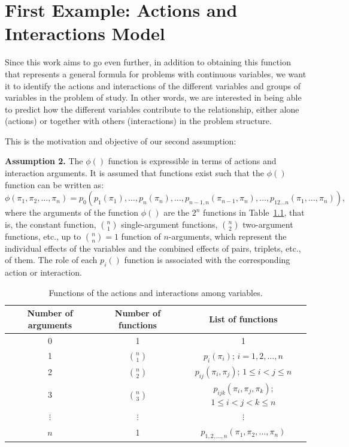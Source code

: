 \documentclass[
	11pt, %
	fleqn, %
	a4paper, %
]{LegrandOrangeBook}
\begin{document}
\chapter{First Example: Actions and Interactions Model}\label{actions-interactionschapter}
\label{ch:firstexampleACtion-Interactions}

Since this work aims to go even further, in addition to obtaining this function that represents a general formula for problems with continuous variables, we want it to identify the actions and interactions of the different variables and groups of variables in the problem of study. In other words, we are interested in being able to predict how the different variables contribute to the relationship, either alone (actions) or together with others (interactions) in the problem structure.

This is the motivation and objective of our second assumption:

\textbf{Assumption 2.} The $\phi()$ function is expressible in terms of actions and interaction arguments. It is assumed that functions exist such that the $\phi()$ function can be written as:
\begin{equation}
\phi(\pi_1,\pi_2,\ldots,\pi_n) = p_0(p_1(\pi_1),\ldots, p_n(\pi_n),\ldots, p_{n-1,n}(\pi_{n-1},\pi_n),\ldots, p_{12\ldots n}(\pi_1,\ldots,\pi_n)),
\label{eq:actionsinteractions}
\end{equation}
where the arguments of the function $\phi()$ are the $2^n$ functions in Table~\ref{tab:functions}, that is, the constant function, $\binom{n}{1}$ single-argument functions, $\binom{n}{2}$ two-argument functions, etc., up to $\binom{n}{n} = 1$ function of $n$-arguments, which represent the individual effects of the variables and the combined effects of pairs, triplets, etc., of them. The role of each $p_i()$ function is associated with the corresponding action or interaction.

\begin{table}[htbp]
\centering
\caption{Functions of the actions and interactions among variables.}
\label{tab:functions}
\begin{tabular}{ccc}
\toprule
Number of arguments & Number of functions & List of functions \\
\midrule
0 & 1 & 1 \\
1 & $\binom{n}{1}$ & $p_i(\pi_i)$; $i = 1,2,\ldots,n$ \\
2 & $\binom{n}{2}$ & $p_{ij}(\pi_i,\pi_j)$; $1 \leq i < j \leq n$ \\
3 & $\binom{n}{3}$ & $p_{ijk}(\pi_i,\pi_j,\pi_k)$; $1 \leq i < j < k \leq n$ \\
$\vdots$ & $\vdots$ & $\vdots$ \\
$n$ & 1 & $p_{1,2,\ldots,n}(\pi_1,\pi_2,\ldots,\pi_n)$ \\
\bottomrule
\end{tabular}
\end{table}
\end{document}
